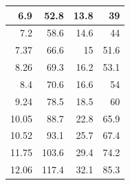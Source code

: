 \documentclass[a4paper, amsfonts, amssymb, amsmath, reprint, showkeys, nofootinbib, twoside]{revtex4-1}
\begin{document}
\begin{table}[H]
\begin{tabular}{|r|r|r|r|}
			6.9   & 52.8  & 13.8 & 39   \\ \hline
			7.2   & 58.6  & 14.6 & 44   \\ \hline
			7.37  & 66.6  & 15   & 51.6 \\ \hline
			8.26  & 69.3  & 16.2 & 53.1 \\ \hline
			8.4   & 70.6  & 16.6 & 54   \\ \hline
			9.24  & 78.5  & 18.5 & 60   \\ \hline
			10.05 & 88.7  & 22.8 & 65.9 \\ \hline
			10.52 & 93.1  & 25.7 & 67.4 \\ \hline
			11.75 & 103.6 & 29.4 & 74.2 \\ \hline
			12.06 & 117.4 & 32.1 & 85.3 \\ \hline
		\end{tabular}
\end{table}
\end{document}
